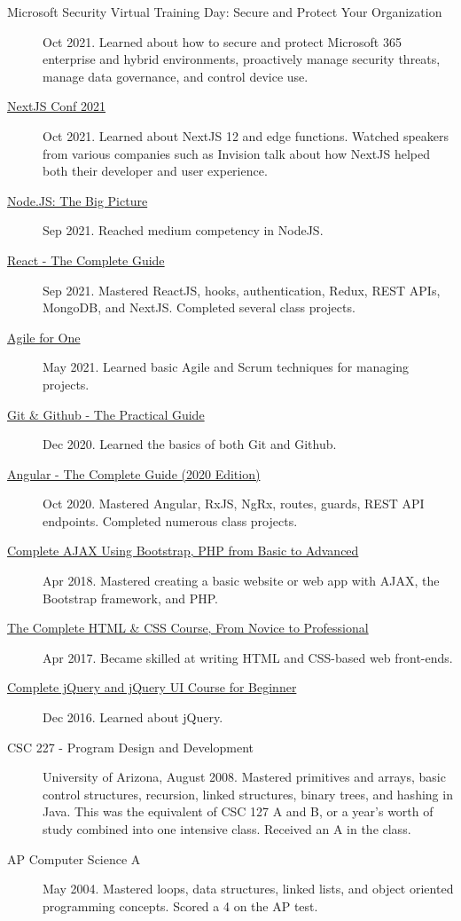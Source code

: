 \documentclass{article}
\begin{document}
\begin{description}
  \item [Microsoft Security Virtual Training Day: Secure and Protect Your Organization] Oct 2021. Learned about how to secure and protect Microsoft 365 enterprise and hybrid environments, proactively manage security threats, manage data governance, and control device use.
  \item [\href{https://www.linkedin.com/posts/alexander-koik-cestone-89304556_alexander-koik-cestones-nextjs-conf-ticket-activity-6855242508260184065-xJP9/}{NextJS Conf 2021}] Oct 2021. Learned about NextJS 12 and edge functions. Watched speakers from various companies such as Invision talk about how NextJS helped both their developer and user experience.
  \item [\href{https://sirkoik.github.io/CurriculumVitae/certifications/Nodejs-The-Big-Picture/certificate.pdf}{Node.JS: The Big Picture}] Sep 2021. Reached medium competency in NodeJS.
  \item [\href{https://www.udemy.com/certificate/UC-2196f0cf-2dce-4a11-9d8e-421827506ad1/}{React - The Complete Guide}] Sep 2021. Mastered ReactJS, hooks, authentication, Redux, REST APIs, MongoDB, and NextJS. Completed several class projects.
  \item [\href{https://sirkoik.github.io/CurriculumVitae/certifications/Agile-for-One/certificate.pdf}{Agile for One}] May 2021. Learned basic Agile and Scrum techniques for managing projects.
  \item [\href{https://sirkoik.github.io/CurriculumVitae/certifications/certificate-of-completion-for-git-github-the-practical-guide.pdf}{Git \& Github - The Practical Guide}] Dec 2020. Learned the basics of both Git and Github.
  \item [\href{https://www.udemy.com/certificate/UC-624f6f83-940e-428f-accd-d16113661ded}{Angular - The Complete Guide (2020 Edition)}] Oct 2020. Mastered Angular, RxJS, NgRx, routes, guards, REST API endpoints. Completed numerous class projects.
  \item [\href{https://www.udemy.com/certificate/UC-E3EMJE4O}{Complete AJAX Using Bootstrap, PHP from Basic to Advanced}] Apr 2018. Mastered creating a basic website or web app with AJAX, the Bootstrap framework, and PHP.
  \item [\href{https://www.udemy.com/certificate/UC-QZDWYX3V}{The Complete HTML \& CSS Course, From Novice to Professional}] Apr 2017. Became skilled at writing HTML and CSS-based web front-ends.
  \item [\href{https://www.udemy.com/certificate/UC-4V285L2N}{Complete jQuery and jQuery UI Course for Beginner}] Dec 2016. Learned about jQuery.
  \item [CSC 227 - Program Design and Development] University of Arizona, August 2008. Mastered primitives and arrays, basic control structures, recursion, linked structures, binary trees, and hashing in Java. This was the equivalent of CSC 127 A and B, or a year's worth of study combined into one intensive class. Received an A in the class.
  \item [AP Computer Science A] May 2004. Mastered loops, data structures, linked lists, and object oriented programming concepts. Scored a 4 on the AP test.
\end{description}
\end{document}
